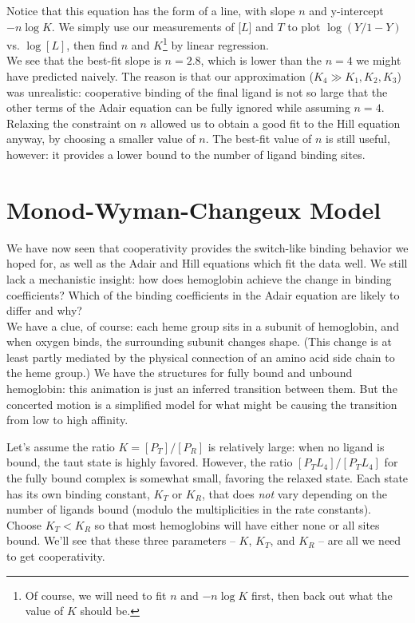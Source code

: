 \documentclass{article}
\begin{document}
Notice that this equation has the form of a line, with slope $n$ and y-intercept $-n\log K$. We simply use our measurements of [$L$] and $T$ to plot $\log (Y/1-Y)$ vs. $\log [L]$, then find $n$ and $K$\footnote{Of course, we will need to fit $n$ and $-n\log K$ first, then back out what the value of $K$ should be.} by linear regression.\\

We see that the best-fit slope is $n=2.8$, which is lower than the $n=4$ we might have predicted naively. The reason is that our approximation ($K_4 \gg K_1, K_2, K_3$) was unrealistic: cooperative binding of the final ligand is not so large that the other terms of the Adair equation can be fully ignored while assuming $n=4$. Relaxing the constraint on $n$ allowed us to obtain a good fit to the Hill equation anyway, by choosing a smaller value of $n$. The best-fit value of $n$ is still useful, however: it provides a lower bound to the number of ligand binding sites.

\section*{Monod-Wyman-Changeux Model}
We have now seen that cooperativity provides the switch-like binding behavior we hoped for, as well as the Adair and Hill equations which fit the data well. We still lack a mechanistic insight: how does hemoglobin achieve the change in binding coefficients? Which of the binding coefficients in the Adair equation are likely to differ and why?\\

We have a clue, of course: each heme group sits in a subunit of hemoglobin, and when oxygen binds, the surrounding subunit changes shape. (This change is at least partly mediated by the physical connection of an amino acid side chain to the heme group.) We have the structures for fully bound and unbound hemoglobin: this animation is just an inferred transition between them. But the concerted motion is a simplified model for what might be causing the transition from low to high affinity.

Let's assume the ratio $K = [P_T]/[P_R]$ is relatively large: when no ligand is bound, the taut state is highly favored. However, the ratio $[P_TL_4]/[P_TL_4]$ for the fully bound complex is somewhat small, favoring the relaxed state. Each state has its own binding constant, $K_T$ or $K_R$, that does \textit{not} vary depending on the number of ligands bound (modulo the multiplicities in the rate constants). Choose $K_T < K_R$ so that most hemoglobins will have either none or all sites bound. We'll see that these three parameters -- $K$, $K_T$, and $K_R$ -- are all we need to get cooperativity.\\
\end{document}
